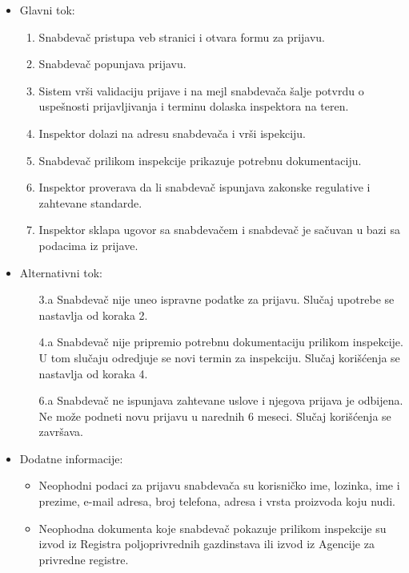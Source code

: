 \begin{itemize}
\begin{itemize}
		\end{itemize}		
	\item Glavni tok:
		\begin{enumerate}
		    \item Snabdevač pristupa veb stranici i otvara formu za prijavu.
		    \item Snabdevač popunjava prijavu.
		    \item Sistem vrši validaciju prijave i na mejl snabdevača šalje potvrdu o uspešnosti prijavljivanja i terminu dolaska inspektora na teren. 
		    \item Inspektor dolazi na adresu snabdevača i vrši ispekciju.
		    \item Snabdevač prilikom inspekcije prikazuje potrebnu dokumentaciju.
		    \item Inspektor proverava da li snabdevač ispunjava zakonske regulative i zahtevane standarde.
		    \item Inspektor sklapa ugovor sa snabdevačem i snabdevač je sačuvan u bazi sa podacima iz prijave.
		\end{enumerate}
	\item Alternativni tok:
		\begin{itemize}
    		\item[3.a] Snabdevač nije uneo ispravne podatke za prijavu. Slučaj upotrebe se nastavlja od koraka 2.
		    \item[4.a] Snabdevač nije pripremio potrebnu dokumentaciju prilikom inspekcije. U tom slučaju odredjuje se novi termin za inspekciju. Slučaj korišćenja se nastavlja od koraka 4.
		    \item[6.a] Snabdevač ne ispunjava zahtevane uslove i njegova prijava je odbijena. Ne može podneti novu prijavu u narednih 6 meseci. Slučaj korišćenja se završava.
		\end{itemize}
	\item Dodatne informacije:
		\begin{itemize}
			\item Neophodni podaci za prijavu snabdevača su korisničko ime, lozinka, ime i prezime, e-mail adresa, broj telefona, adresa i vrsta proizvoda koju nudi. 
			\item Neophodna dokumenta koje snabdevač pokazuje prilikom inspekcije su izvod iz Registra poljoprivrednih gazdinstava ili izvod iz Agencije za privredne registre.
		\end{itemize}						
\end{itemize}